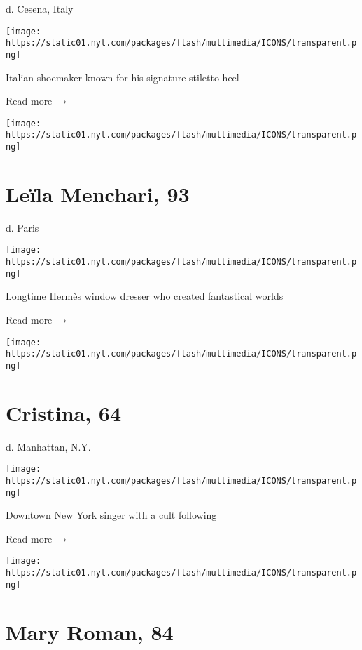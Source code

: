 d. Cesena, Italy

\texttt{[image: https://static01.nyt.com/packages/flash/multimedia/ICONS/transparent.png]}

Italian shoemaker known for his signature stiletto heel

 Read more~→

\href{https://www.nytimes.com/2020/04/06/obituaries/leila-menchari-dead-coronavirus.html}{}

\texttt{[image: https://static01.nyt.com/packages/flash/multimedia/ICONS/transparent.png]}

\hypertarget{leuxefla-menchari-93}{%
\section{Leïla Menchari, 93}\label{leuxefla-menchari-93}}

d. Paris

\texttt{[image: https://static01.nyt.com/packages/flash/multimedia/ICONS/transparent.png]}

Longtime Hermès window dresser who created fantastical worlds

 Read more~→

\href{https://www.nytimes.com/2020/04/05/obituaries/cristina-dead.html}{}

\texttt{[image: https://static01.nyt.com/packages/flash/multimedia/ICONS/transparent.png]}

\hypertarget{cristina-64}{%
\section{Cristina, 64}\label{cristina-64}}

d. Manhattan, N.Y.

\texttt{[image: https://static01.nyt.com/packages/flash/multimedia/ICONS/transparent.png]}

Downtown New York singer with a cult following

 Read more~→

\href{https://www.nytimes.com/2020/04/05/obituaries/mary-roman-dead.html}{}

\texttt{[image: https://static01.nyt.com/packages/flash/multimedia/ICONS/transparent.png]}

\hypertarget{mary-roman-84}{%
\section{Mary Roman, 84}\label{mary-roman-84}}

